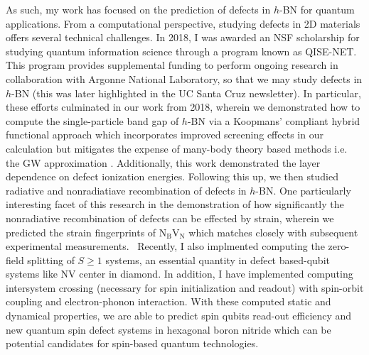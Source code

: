As such, my work has focused on the prediction of defects in $h$-BN for quantum applications. From a computational perspective, studying defects in 2D materials offers several technical challenges. In 2018, I was awarded an NSF scholarship for studying quantum information science through a program known as QISE-NET. This program provides supplemental funding to perform ongoing research in collaboration with Argonne National Laboratory, so that we may study defects in $h$-BN (this was later highlighted in the UC Santa Cruz newsletter). In particular, these efforts culminated in our work from 2018, wherein we demonstrated how to compute the single-particle band gap of $h$-BN via a Koopmans' compliant hybrid functional approach which incorporates improved screening effects in our calculation but mitigates the expense of many-body theory based methods i.e. the GW approximation \cite{smart2018fundamental}. Additionally, this work demonstrated the layer dependence on defect ionization energies. Following this up, we then studied radiative and nonradiatiave recombination of defects in $h$-BN. One particularly interesting facet of this research in the demonstration of how significantly the nonradiative recombination of defects can be effected by strain, wherein we predicted the strain fingerprints of N$_\text{B}$V$_\text{N}$ which matches closely with subsequent experimental measurements.~\cite{mendelson2020strain}
Recently, I also implmented computing the zero-field splitting of $S \ge 1$ systems, an essential quantity in defect based-qubit systems like NV center in diamond. In addition, I have implemented computing intersystem crossing (necessary for spin initialization and readout) with spin-orbit coupling and electron-phonon interaction. With these computed static and dynamical properties,  we are able to predict spin qubits read-out efficiency and new quantum spin defect systems in hexagonal boron nitride which can be potential candidates for spin-based quantum technologies.
